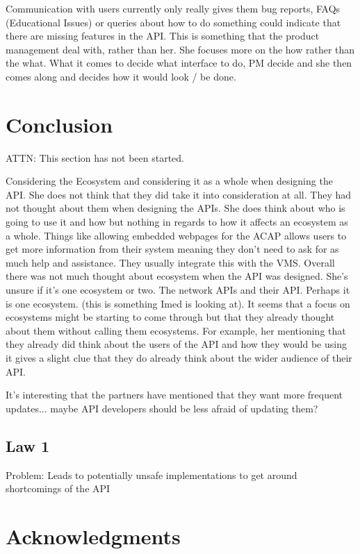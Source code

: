\documentclass{sig-alternate}
\begin{document}
Communication with users currently only really gives them bug reports, FAQs (Educational Issues) or queries about how to do something could indicate that there are missing features in the API. This is something that the product management deal with, rather than her. She focuses more on the how rather than the what. What it comes to decide what interface to do, PM decide and she then comes along and decides how it would look / be done. 






\section{Conclusion} \label{conclusion}
ATTN: This section has not been started. 






Considering the Ecosystem and considering it as a whole when designing the API. She does not think that they did take it into consideration at all. They had not thought about them when designing the APIs. She does think about who is going to use it and how but nothing in regards to how it affects an ecosystem as a whole. Things like allowing embedded webpages for the ACAP allows users to get more information from their system meaning they don’t need to ask for as much help and assistance. They usually integrate this with the VMS. Overall there was not much thought about ecosystem when the API was designed. She’s unsure if it’s one ecosystem or two. The network APIs and their API. Perhaps it is one ecosystem. (this is something Imed is looking at).
It seems that a focus on ecosystems might be starting to come through but that they already thought about them without calling them ecosystems. For example, her mentioning that they already did think about the users of the API and how they would be using it gives a slight clue that they do already think about the wider audience of their API.



It's interesting that the partners have mentioned that they want more frequent updates... maybe API developers should be less afraid of updating them? 


\subsection{Law 1}

Problem: Leads to potentially unsafe implementations to get around shortcomings of the API


\section{Acknowledgments}



 
\end{document}
